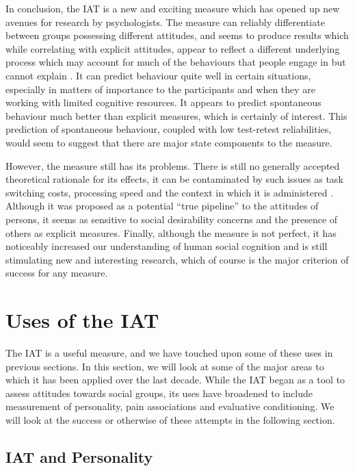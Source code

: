 In conclusion, the IAT is a new and exciting measure which has opened up new avenues for research by psychologists.   The measure can reliably differentiate between groups possessing different attitudes, and seems to produce results which while correlating with explicit attitudes, appear to reflect a different underlying process which may account for much of the behaviours that people engage in but cannot explain \cite{Nosek2007a}. It can predict behaviour quite well in certain situations, especially in matters of importance to the participants and when they are working with limited cognitive resources. It appears to predict spontaneous behaviour much better than explicit measures, which is certainly of interest. This prediction of spontaneous behaviour, coupled with low test-retest reliabilities, would seem to suggest that there are major state components to the measure. 

However, the measure still has its problems. There is still no generally accepted theoretical rationale for its effects, it can be contaminated by such issues as task switching costs\cite{Klauer2005}, processing speed\cite{Blanton2006} and the context in which it is administered \cite{Boysen2006}. Although it was proposed as a potential ``true pipeline'' to the attitudes of persons, it seems as sensitive to social desirability concerns and the presence of others as explicit measures. Finally, although the measure is not perfect, it has noticeably increased our understanding of human social cognition and is still stimulating new and interesting research, which of course is the major criterion of success for any measure. 

\section{Uses of the IAT}%

The IAT is a useful measure, and we have touched upon some of these uses in previous sections. In this section, we will look at some of the major areas to which it has been applied over the last decade. While the IAT began as a tool to assess attitudes towards social groups, its uses have broadened to include measurement of personality, pain associations and evaluative conditioning. We will look at the success or otherwise of these attempts in the following section. 

\subsection{IAT and Personality}

